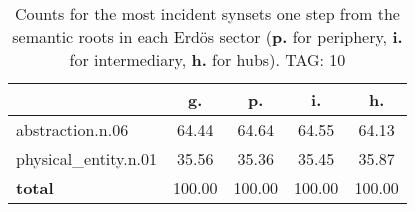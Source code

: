 \begin{table}[h!]
\begin{center}
\begin{tabular}{| l | c | c | c | c |}\hline
 & g. & p. & i. & h. \\\hline
abstraction.n.06 & 64.44  & 64.64  & 64.55  & 64.13 \\\hline
physical\_entity.n.01 & 35.56  & 35.36  & 35.45  & 35.87 \\\hline
{{\bf total}} & 100.00  & 100.00  & 100.00  & 100.00 \\\hline
\end{tabular}
\caption{Counts for the most incident synsets one step from the semantic roots in each Erd\"os sector ({\bf p.} for periphery, {\bf i.} for intermediary, {\bf h.} for hubs). TAG: 10}
\end{center}
\end{table}